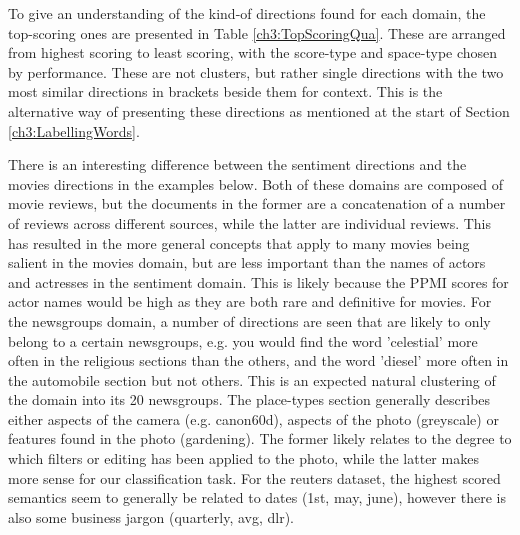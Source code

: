 To give an understanding of the kind-of directions found for each domain, the top-scoring ones are presented in Table \ref{ch3:TopScoringQua}. These are arranged from highest scoring to least scoring, with the score-type and space-type chosen by performance. These are not clusters, but rather single directions with the two most similar directions in brackets beside them for context. This is the alternative way of presenting these directions as mentioned at the start of Section \ref{ch3:LabellingWords}. 

There is an  interesting difference between the sentiment directions and the movies directions in the examples below. Both of these domains are composed of movie reviews, but the documents in the former are a concatenation of a number of reviews across different sources, while the latter are individual reviews. This has resulted in the more general concepts that apply to many movies being salient in the movies domain, but are less important than the names of actors and actresses in the sentiment domain. This is likely because the PPMI scores for actor names would be high as they are both rare and definitive for movies. For the newsgroups domain, a number of directions  are seen that are likely to only belong to a certain newsgroups, e.g. you would find the word 'celestial' more often in the religious sections than the others, and the word 'diesel' more often in the automobile section but not others. This is an expected natural clustering of the domain into its 20 newsgroups. The place-types section generally describes either aspects of the camera (e.g. canon60d), aspects of the photo (greyscale) or features found in the photo (gardening). The former likely relates to the degree to which filters or editing has been applied to the photo, while the latter makes more sense for our classification task. For the reuters dataset, the highest scored semantics seem to generally be related to dates (1st, may, june), however there is also some business jargon (quarterly, avg, dlr). 

